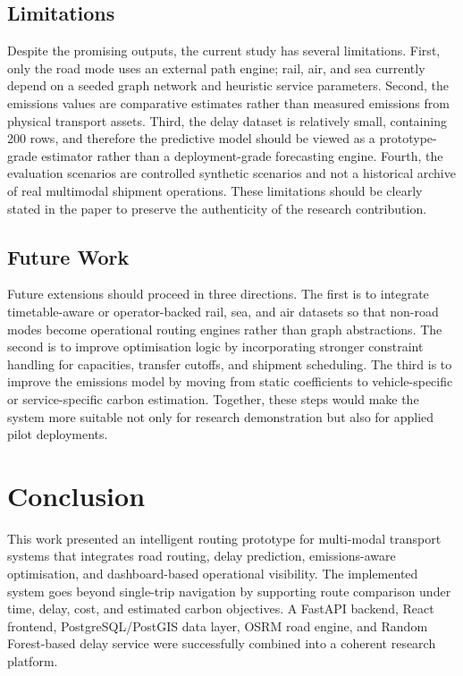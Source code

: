 \subsection{Limitations}
Despite the promising outputs, the current study has several limitations. First, only the road mode uses an external path engine; rail, air, and sea currently depend on a seeded graph network and heuristic service parameters. Second, the emissions values are comparative estimates rather than measured emissions from physical transport assets. Third, the delay dataset is relatively small, containing 200 rows, and therefore the predictive model should be viewed as a prototype-grade estimator rather than a deployment-grade forecasting engine. Fourth, the evaluation scenarios are controlled synthetic scenarios and not a historical archive of real multimodal shipment operations. These limitations should be clearly stated in the paper to preserve the authenticity of the research contribution.

\subsection{Future Work}
Future extensions should proceed in three directions. The first is to integrate timetable-aware or operator-backed rail, sea, and air datasets so that non-road modes become operational routing engines rather than graph abstractions. The second is to improve optimisation logic by incorporating stronger constraint handling for capacities, transfer cutoffs, and shipment scheduling. The third is to improve the emissions model by moving from static coefficients to vehicle-specific or service-specific carbon estimation. Together, these steps would make the system more suitable not only for research demonstration but also for applied pilot deployments.

\section{Conclusion}
This work presented an intelligent routing prototype for multi-modal transport systems that integrates road routing, delay prediction, emissions-aware optimisation, and dashboard-based operational visibility. The implemented system goes beyond single-trip navigation by supporting route comparison under time, delay, cost, and estimated carbon objectives. A FastAPI backend, React frontend, PostgreSQL/PostGIS data layer, OSRM road engine, and Random Forest-based delay service were successfully combined into a coherent research platform.

